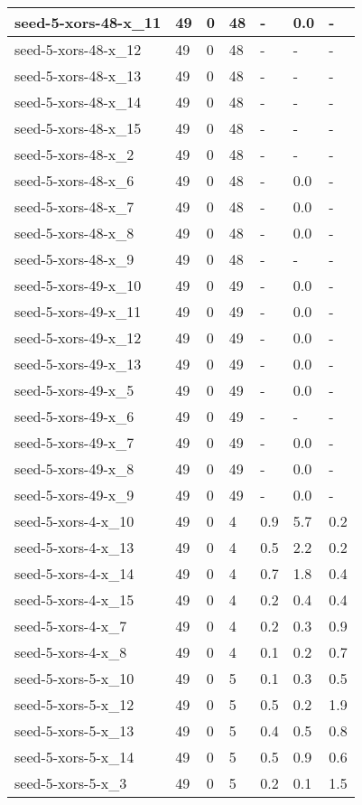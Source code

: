 \begin{scriptsize}
\begin{longtable}{|p{5cm}|l|l|l|l|l|l|}
seed-5-xors-48-x\_11&49&0&48&-&0.0&- \\ \hline 
seed-5-xors-48-x\_12&49&0&48&-&-&- \\ \hline 
seed-5-xors-48-x\_13&49&0&48&-&-&- \\ \hline 
seed-5-xors-48-x\_14&49&0&48&-&-&- \\ \hline 
seed-5-xors-48-x\_15&49&0&48&-&-&- \\ \hline 
seed-5-xors-48-x\_2&49&0&48&-&-&- \\ \hline 
seed-5-xors-48-x\_6&49&0&48&-&0.0&- \\ \hline 
seed-5-xors-48-x\_7&49&0&48&-&0.0&- \\ \hline 
seed-5-xors-48-x\_8&49&0&48&-&0.0&- \\ \hline 
seed-5-xors-48-x\_9&49&0&48&-&-&- \\ \hline 
seed-5-xors-49-x\_10&49&0&49&-&0.0&- \\ \hline 
seed-5-xors-49-x\_11&49&0&49&-&0.0&- \\ \hline 
seed-5-xors-49-x\_12&49&0&49&-&0.0&- \\ \hline 
seed-5-xors-49-x\_13&49&0&49&-&0.0&- \\ \hline 
seed-5-xors-49-x\_5&49&0&49&-&0.0&- \\ \hline 
seed-5-xors-49-x\_6&49&0&49&-&-&- \\ \hline 
seed-5-xors-49-x\_7&49&0&49&-&0.0&- \\ \hline 
seed-5-xors-49-x\_8&49&0&49&-&0.0&- \\ \hline 
seed-5-xors-49-x\_9&49&0&49&-&0.0&- \\ \hline 
seed-5-xors-4-x\_10&49&0&4&0.9&5.7&0.2 \\ \hline 
seed-5-xors-4-x\_13&49&0&4&0.5&2.2&0.2 \\ \hline 
seed-5-xors-4-x\_14&49&0&4&0.7&1.8&0.4 \\ \hline 
seed-5-xors-4-x\_15&49&0&4&0.2&0.4&0.4 \\ \hline 
seed-5-xors-4-x\_7&49&0&4&0.2&0.3&0.9 \\ \hline 
seed-5-xors-4-x\_8&49&0&4&0.1&0.2&0.7 \\ \hline 
seed-5-xors-5-x\_10&49&0&5&0.1&0.3&0.5 \\ \hline 
seed-5-xors-5-x\_12&49&0&5&0.5&0.2&1.9 \\ \hline 
seed-5-xors-5-x\_13&49&0&5&0.4&0.5&0.8 \\ \hline 
seed-5-xors-5-x\_14&49&0&5&0.5&0.9&0.6 \\ \hline 
seed-5-xors-5-x\_3&49&0&5&0.2&0.1&1.5 \\ \hline 

\end{longtable}
\end{scriptsize}
